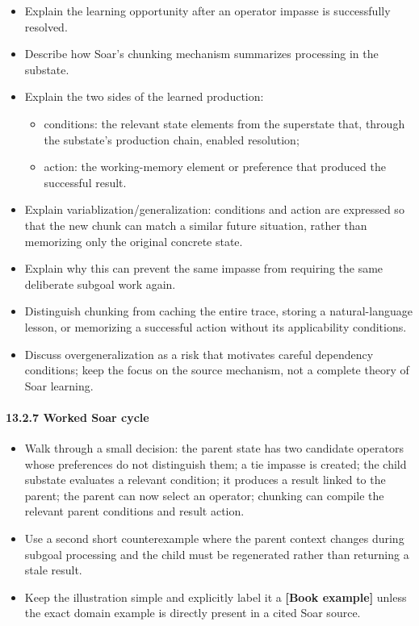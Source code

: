 \begin{itemize}
\tightlist
\item
  Explain the learning opportunity after an operator impasse is successfully resolved.
\item
  Describe how Soar's chunking mechanism summarizes processing in the substate.
\item
  Explain the two sides of the learned production:

  \begin{itemize}
  \tightlist
  \item
    conditions: the relevant state elements from the superstate that, through the substate's production chain, enabled resolution;
  \item
    action: the working-memory element or preference that produced the successful result.
  \end{itemize}
\item
  Explain variablization/generalization: conditions and action are expressed so that the new chunk can match a similar future situation, rather than memorizing only the original concrete state.
\item
  Explain why this can prevent the same impasse from requiring the same deliberate subgoal work again.
\item
  Distinguish chunking from caching the entire trace, storing a natural-language lesson, or memorizing a successful action without its applicability conditions.
\item
  Discuss overgeneralization as a risk that motivates careful dependency conditions; keep the focus on the source mechanism, not a complete theory of Soar learning.
\end{itemize}

\paragraph{13.2.7 Worked Soar cycle}\label{worked-soar-cycle}

\begin{itemize}
\tightlist
\item
  Walk through a small decision: the parent state has two candidate operators whose preferences do not distinguish them; a tie impasse is created; the child substate evaluates a relevant condition; it produces a result linked to the parent; the parent can now select an operator; chunking can compile the relevant parent conditions and result action.
\item
  Use a second short counterexample where the parent context changes during subgoal processing and the child must be regenerated rather than returning a stale result.
\item
  Keep the illustration simple and explicitly label it a \textbf{{[}Book example{]}} unless the exact domain example is directly present in a cited Soar source.
\end{itemize}

